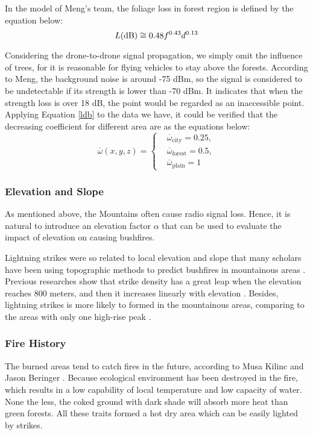 \documentclass[13pt]{ctexart} %
\begin{document}
In the model of Meng's team, the foliage loss in forest region is defined by the equation below:
\begin{equation}\label{ldb}
    L({\rm dB})\cong 0.48 f^{0.43} d^{0.13}
\end{equation}

Considering the drone-to-drone signal propagation, we simply omit the influence of trees, for it is reasonable for flying vehicles to stay above the forests. According to Meng, the background noise is around -75 dBm, so the signal is considered to be undetectable if its strength is lower than -70 dBm. It indicates that when the strength loss is over 18 dB, the point would be regarded as an inaccessible point. Applying Equation \eqref{ldb} to the data we have, it could be verified that the decreasing coefficient for different area are as the equations below:
\begin{equation}\label{omega-function}
    \overline{\omega}
    (x,y,z)=
    \left\{
    \begin{aligned}
         & \overline{\omega}_{\text{city}}=0.25,  \\
         & \overline{\omega}_{\text{forest}}=0.5, \\
         & \overline{\omega}_{\text{plain}}=1
    \end{aligned}
    \right.
\end{equation}

\subsubsection{Elevation and Slope}
As mentioned above, the Mountains often cause radio signal loss. Hence, it is natural to introduce an elevation factor $\alpha$ that can be used to evaluate the impact of elevation on causing bushfires.

Lightning strikes were so related to local elevation and slope that many scholars have been using topographic methods to predict bushfires in mountainous areas \cite{Jiao-wildfire-cn}. Previous researches show that strike density has a great leap when the elevation reaches 800 meters, and then it increases linearly with elevation \cite{Musa-lightning02}. Besides, lightning strikes is more likely to formed in the mountainous areas, comparing to the areas with only one high-rise peak \cite{Jiao-wildfire-cn}.


\subsubsection{Fire History}
The burned areas tend to catch fires in the future, according to Musa Kilinc and Jason Beringer \cite{Musa-lightning02}. Because ecological environment has been destroyed in the fire, which results in a low capability of local temperature and low capacity of water. None the less, the coked ground with dark shade will absorb more heat than green forests. All these traits formed a hot dry area which can be easily lighted by strikes.
\end{document}
